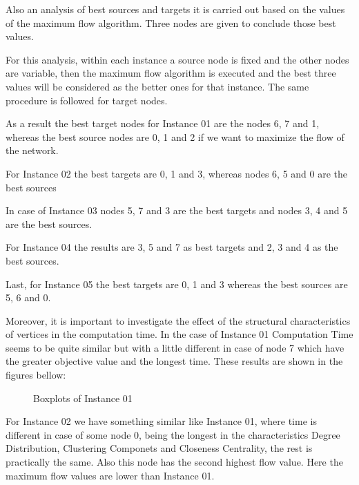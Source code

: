 \documentclass[10pt,a4paper,openany]{article}
\begin{document}
	Also an analysis of best sources and targets it is carried out based on the values of the maximum flow algorithm. Three nodes are given to conclude those best values.
	
	For this analysis, within each instance a source node is fixed and the other nodes are variable, then the maximum flow algorithm is executed and the best three values will be considered as the better ones for that instance. The same procedure is followed for target nodes. 
	
	As a result the best target nodes for Instance 01 are the nodes 6, 7 and 1, whereas the best source nodes are 0, 1 and 2 if we want to maximize the flow of the network.
	
	For Instance 02 the best targets are 0, 1 and 3, whereas nodes 6, 5 and 0 are the best sources
	
	In case of Instance 03 nodes 5, 7 and 3 are the best targets and nodes 3, 4 and 5 are the best sources.
	
	For Instance 04 the results are 3, 5 and 7 as best targets and 2, 3 and 4 as the best sources.
	
	Last, for Instance 05 the best targets are 0, 1 and 3 whereas the best sources are 5, 6 and 0.
	
	Moreover, it is important to investigate the effect of the structural characteristics of vertices in the computation time.
	In the case of Instance 01 Computation Time seems to be quite similar but with a little different in case of node 7 which have the greater objective value and the longest time. 
	These results are shown in the figures bellow:
		
	\begin{figure}[H]
		\centering
		
		\caption{Boxplots of Instance 01} \label{fig:instances}
	\end{figure}

For Instance 02 we have something similar like Instance 01, where time is different in case of some node 0, being the longest in the characteristics Degree Distribution, Clustering Componets and Closeness Centrality, the rest is practically the same. Also this node has the second highest flow value. Here the maximum flow values are lower than Instance 01.
\end{document}
